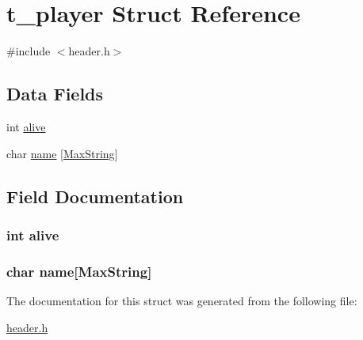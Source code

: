 \hypertarget{structt__player}{\section{t\-\_\-player Struct Reference}
\label{structt__player}
}


{\ttfamily \#include $<$header.\-h$>$}

\subsection*{Data Fields}
\begin{DoxyCompactItemize}
\item 
int \hyperlink{structt__player_afaea7716a081e71f804e80c2d5a92390}{alive}
\item 
char \hyperlink{structt__player_ab27f28c5ead39031421706ddbbd1edea}{name} \mbox{[}\hyperlink{header_8h_ab154998a3a376095f3601bc35c5cf523}{Max\-String}\mbox{]}
\end{DoxyCompactItemize}


\subsection{Field Documentation}
\hypertarget{structt__player_afaea7716a081e71f804e80c2d5a92390}{
\subsubsection[{alive}]{\setlength{\rightskip}{0pt plus 5cm}int alive}}\label{structt__player_afaea7716a081e71f804e80c2d5a92390}
\hypertarget{structt__player_ab27f28c5ead39031421706ddbbd1edea}{
\subsubsection[{name}]{\setlength{\rightskip}{0pt plus 5cm}char name\mbox{[}{\bf Max\-String}\mbox{]}}}\label{structt__player_ab27f28c5ead39031421706ddbbd1edea}


The documentation for this struct was generated from the following file\-:\begin{DoxyCompactItemize}
\item 
\hyperlink{header_8h}{header.\-h}\end{DoxyCompactItemize}
